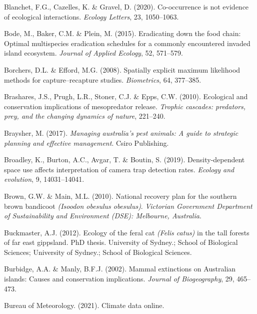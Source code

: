 \documentclass[11pt,a4paper,titlepage,twoside,openright]{style/unimelbthesis}
\begin{document}
\begin{mainmatter}
\leavevmode\hypertarget{ref-guillaume2020co-occurrence}{}%
Blanchet, F.G., Cazelles, K. \& Gravel, D. (2020). Co-occurrence is not evidence of ecological interactions. \emph{Ecology Letters}, 23, 1050--1063.

\leavevmode\hypertarget{ref-bode2015eradicating}{}%
Bode, M., Baker, C.M. \& Plein, M. (2015). Eradicating down the food chain: Optimal multispecies eradication schedules for a commonly encountered invaded island ecosystem. \emph{Journal of Applied Ecology}, 52, 571--579.

\leavevmode\hypertarget{ref-borchers2008spatially}{}%
Borchers, D.L. \& Efford, M.G. (2008). Spatially explicit maximum likelihood methods for capture--recapture studies. \emph{Biometrics}, 64, 377--385.

\leavevmode\hypertarget{ref-brashares2010ecological}{}%
Brashares, J.S., Prugh, L.R., Stoner, C.J. \& Epps, C.W. (2010). Ecological and conservation implications of mesopredator release. \emph{Trophic cascades: predators, prey, and the changing dynamics of nature}, 221--240.

\leavevmode\hypertarget{ref-braysher2017managing}{}%
Braysher, M. (2017). \emph{Managing australia's pest animals: A guide to strategic planning and effective management}. Csiro Publishing.

\leavevmode\hypertarget{ref-broadley2019density}{}%
Broadley, K., Burton, A.C., Avgar, T. \& Boutin, S. (2019). Density-dependent space use affects interpretation of camera trap detection rates. \emph{Ecology and evolution}, 9, 14031--14041.

\leavevmode\hypertarget{ref-brown2010national}{}%
Brown, G.W. \& Main, M.L. (2010). National recovery plan for the southern brown bandicoot \emph{(Isoodon obesulus obesulus)}. \emph{Victorian Government Department of Sustainability and Environment (DSE): Melbourne, Australia}.

\leavevmode\hypertarget{ref-buckmaster2012ecology}{}%
Buckmaster, A.J. (2012). Ecology of the feral cat \emph{(Felis catus)} in the tall forests of far east gippsland. PhD thesis. University of Sydney.; School of Biological Sciences; University of Sydney.; School of Biological Sciences.

\leavevmode\hypertarget{ref-burbidge2002mammal}{}%
Burbidge, A.A. \& Manly, B.F.J. (2002). Mammal extinctions on Australian islands: Causes and conservation implications. \emph{Journal of Biogeography}, 29, 465--473.

\leavevmode\hypertarget{ref-BOM2021}{}%
Bureau of Meteorology. (2021). Climate data online.


\end{mainmatter}
\end{document}

